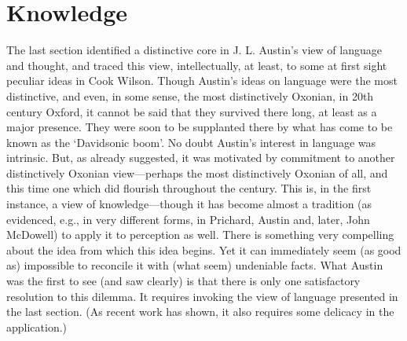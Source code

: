 \section{Knowledge} %
\label{sec:knowledge}

The last section identified a distinctive core in J. L. Austin’s view of language and thought, and traced this view, intellectually, at least, to some at first sight peculiar ideas in Cook Wilson. Though Austin’s ideas on language were the most distinctive, and even, in some sense, the most distinctively Oxonian, in 20th century Oxford, it cannot be said that they survived there long, at least as a major presence. They were soon to be supplanted there by what has come to be known as the ‘Davidsonic boom’. No doubt Austin’s interest in language was intrinsic. But, as already suggested, it was motivated by commitment to another distinctively Oxonian view---perhaps the most distinctively Oxonian of all, and this time one which did flourish throughout the century. This is, in the first instance, a view of knowledge---though it has become almost a tradition (as evidenced, e.g., in very different forms, in Prichard, Austin and, later, John McDowell) to apply it to perception as well. There is something very compelling about the idea from which this idea begins. Yet it can immediately seem (as good as) impossible to reconcile it with (what seem) undeniable facts. What Austin was the first to see (and saw clearly) is that there is only one satisfactory resolution to this dilemma. It requires invoking the view of language presented in the last section. (As recent work has shown, it also requires some delicacy in the application.)


